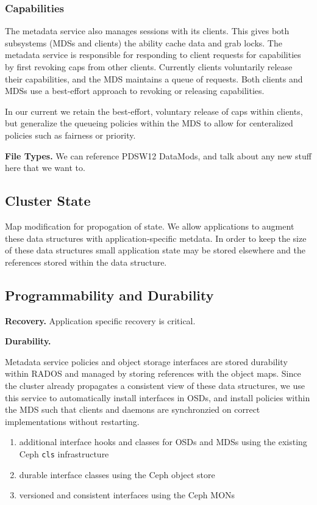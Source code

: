 \documentclass[10pt,twocolumn]{article}
\begin{document}
\subsubsection{Capabilities}

The metadata service also manages sessions with its clients. This gives both subsystems (MDSs and clients) the ability cache data and grab locks. The metadata service is
responsible for responding to client requests for capabilities by first
revoking caps from other clients. Currently clients voluntarily
release their capabilities, and the MDS maintains a queue of requests.
Both clients and MDSs use a best-effort approach to revoking or releasing capabilities.

In our current we retain the best-effort, voluntary release of caps within
clients, but generalize the queueing policies within the MDS to allow for
centeralized policies such as fairness or priority.

{\bf File Types.}
We can reference PDSW12 DataMods, and talk about any new stuff here that we
want to.


\subsection{Cluster State}

Map modification for propogation of state. We allow applications to augment
these data structures with application-specific metdata. In order to keep the
size of these data structures small application state may be stored elsewhere
and the references stored within the data structure.

\subsection{Programmability and Durability}

{\bf Recovery.}
Application specific recovery is critical.

{\bf Durability.}


Metadata service policies and object storage interfaces are stored durability
within RADOS and managed by storing references with the object maps. Since
the cluster already propagates a consistent view of these data structures,
we use this service to automatically install interfaces in OSDs, and install
policies within the MDS such that clients and daemons are synchronzied on
correct implementations without restarting.

\iffalse
\begin{enumerate}
\def\labelenumi{\arabic{enumi}.}
\item
  additional interface hooks and classes for OSDs and MDSs using the
  existing Ceph \texttt{cls} infrastructure
\item
  durable interface classes using the Ceph object store
\item
  versioned and consistent interfaces using the Ceph MONs
\end{enumerate}
\end{document}
